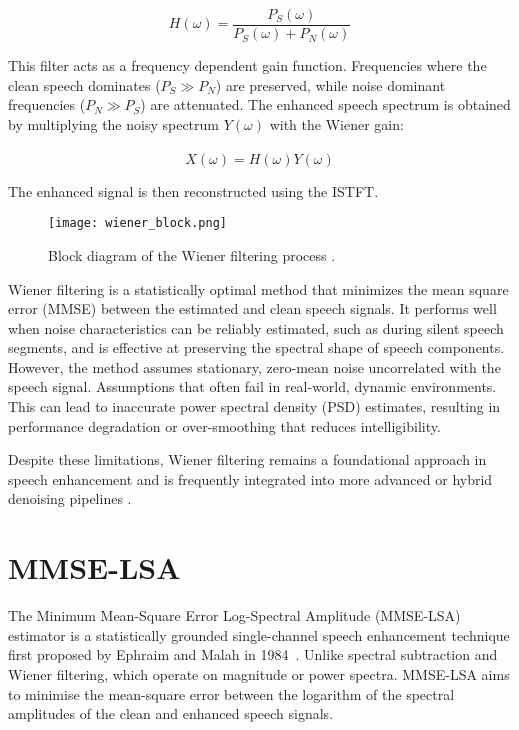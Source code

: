 \begin{equation}
    H(\omega) = \frac{P_S(\omega)}{P_S(\omega) + P_N(\omega)}
\end{equation}

This filter acts as a frequency dependent gain function. Frequencies where the clean speech dominates (\(P_S \gg P_N\)) are preserved, while noise dominant frequencies (\(P_N \gg P_S\)) are attenuated. The enhanced speech spectrum is obtained by multiplying the noisy spectrum \(Y(\omega)\) with the Wiener gain:

\begin{equation}
    \hat{X}(\omega) = H(\omega)Y(\omega)
\end{equation}

The enhanced signal is then reconstructed using the ISTFT.

\begin{figure}[h]
    \centering
    \texttt{[image: wiener\_block.png]}
    \caption{\label{fig:WienerBlock} Block diagram of the Wiener filtering process \cite{dubey2016evaluation}.}
\end{figure}

Wiener filtering is a statistically optimal method that minimizes the mean square error (MMSE) between the estimated and clean speech signals. It performs well when noise characteristics can be reliably estimated, such as during silent speech segments, and is effective at preserving the spectral shape of speech components. However, the method assumes stationary, zero-mean noise uncorrelated with the speech signal. Assumptions that often fail in real-world, dynamic environments. This can lead to inaccurate power spectral density (PSD) estimates, resulting in performance degradation or over-smoothing that reduces intelligibility.

Despite these limitations, Wiener filtering remains a foundational approach in speech enhancement and is frequently integrated into more advanced or hybrid denoising pipelines \cite{dubey2016evaluation, loizou2013speech}.


\section{MMSE-LSA}
\label{sec:mmse_lsa}

The Minimum Mean-Square Error Log-Spectral Amplitude (MMSE-LSA) estimator is a statistically grounded single-channel speech enhancement technique first proposed by Ephraim and Malah in 1984~\cite{ephraim1984speech}. Unlike spectral subtraction and Wiener filtering, which operate on magnitude or power spectra. MMSE-LSA aims to minimise the mean-square error between the logarithm of the spectral amplitudes of the clean and enhanced speech signals.

